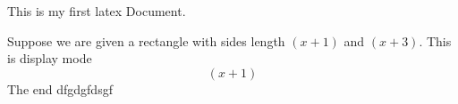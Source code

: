 \documentclass[11pt]{article}
\begin{document}
This is my first latex Document.

Suppose we are given a rectangle with sides length $(x+1)$ and $(x+3)$. This is display mode $$(x+1)$$ The end
dfgdgfdsgf
\end{document}
